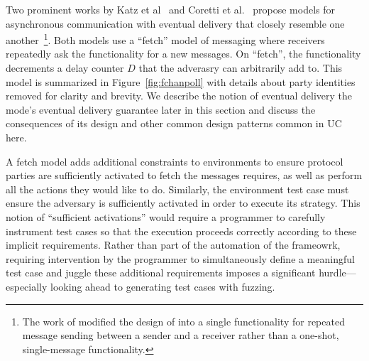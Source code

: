 Two prominent works by Katz et al~\cite{katzuc} and Coretti et al.~\cite{corettimpc} propose models for asynchronous communication with eventual delivery that closely resemble one another~\footnote{The work of \cite{corettimpc} modified the design of \cite{katzuc} into a single functionality for repeated message sending between a sender and a receiver rather than a one-shot, single-message functionality.}.
Both models use a ``fetch'' model of messaging where receivers repeatedly ask the functionality for a new messages. 
On ``fetch'', the functionality decrements a delay counter $D$ that the adverasry can arbitrarily add to.
This model is summarized in Figure~\ref{fig:fchanpoll} with details about party identities removed for clarity and brevity.
We describe the notion of eventual delivery the mode's eventual delivery guarantee later in this section and discuss the consequences of its design and other common design patterns common in UC here. 

A fetch model adds additional constraints to environments to ensure protocol parties are sufficiently activated to fetch the messages requires, as well as perform all the actions they would like to do. 
Similarly, the environment test case must ensure the adversary is sufficiently activated in order to execute its strategy. 
This notion of ``sufficient activations'' would require a programmer to carefully instrument test cases so that the execution proceeds correctly according to these implicit requirements.
Rather than part of the automation of the frameowrk, requiring intervention by the programmer to simultaneously define a meaningful test case and juggle these additional requirements imposes a significant hurdle---especially looking ahead to generating test cases with fuzzing.


